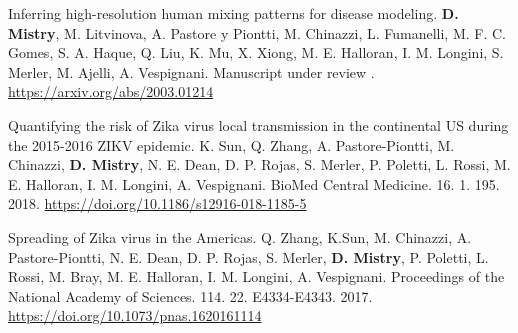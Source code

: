 \begin{cventries}
  \cvpublicationentrytwo
    {Inferring high-resolution human mixing patterns for disease modeling.} %
    {\textbf{D. Mistry}, M. Litvinova, A. Pastore y Piontti, M. Chinazzi, L. Fumanelli, M. F. C. Gomes, S. A. Haque, Q. Liu, K. Mu, X. Xiong, M. E. Halloran, I. M. Longini, S. Merler, M. Ajelli, A. Vespignani.} %
    {} %
    {} %
    {} %
    {} %
    {} %
    {Manuscript under review
    .} %
    {\href{https://arxiv.org/abs/2003.01214}{https://arxiv.org/abs/2003.01214 \faLink\acvHeaderIconSep}} %
    \vspace{.5mm}


  \cvpublicationentrytwo
    {Quantifying the risk of Zika virus local transmission in the continental US during the 2015-2016 ZIKV epidemic.} %
    {K. Sun, Q. Zhang, A. Pastore-Piontti, M. Chinazzi, \textbf{D. Mistry}, N. E. Dean, D. P. Rojas, S. Merler, P. Poletti, L. Rossi, M. E. Halloran, I. M. Longini, A. Vespignani.} %
    {BioMed Central Medicine. } %
    { 16.} %
    { 1. } %
    { 195.} %
    {2018.} %
    {} %
    {\href{https://doi.org/10.1186/s12916-018-1185-5}{https://doi.org/10.1186/s12916-018-1185-5 \faLink\acvHeaderIconSep}} %
    \vspace{.5mm}

  \cvpublicationentrytwo
    {Spreading of Zika virus in the Americas.} %
    {Q. Zhang, K.Sun, M. Chinazzi, A. Pastore-Piontti, N. E. Dean, D. P. Rojas, S. Merler, \textbf{D. Mistry}, P. Poletti, L. Rossi, M. Bray, M. E. Halloran, I. M. Longini, A. Vespignani.} %
    {Proceedings of the National Academy of Sciences. } %
    { 114.} %
    { 22. } %
    {  E4334-E4343. } %
    { 2017.} %
    {} %
    {\href{https://doi.org/10.1073/pnas.1620161114}{https://doi.org/10.1073/pnas.1620161114
    \faLink\acvHeaderIconSep}} %
    \vspace{.5mm}


\end{cventries}
